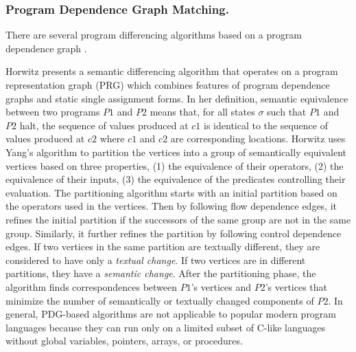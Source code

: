 \subsubsection{Program Dependence Graph Matching.}
There are several program differencing algorithms based on a program dependence graph \cite{Horwitz1990, Binkley1995, Jackson1994}. 

Horwitz \cite{Horwitz1990} presents a semantic differencing algorithm that operates on a program representation graph (PRG) which combines features of program dependence graphs and static single assignment forms. In her definition, semantic equivalence between two programs $P1$ and $P2$ means that, for all states $\sigma$ such that $P1$ and $P2$ halt, the sequence of values produced at $c1$ is identical to the sequence of values produced at $c2$ where $c1$ and $c2$ are corresponding locations. 
Horwitz uses Yang's algorithm \cite{Yang1989} to partition the vertices into a group of semantically equivalent vertices based on three properties, (1) the equivalence of their operators, (2) the equivalence of their inputs, (3) the equivalence of the predicates controlling their evaluation. The partitioning algorithm starts with an initial partition based on the operators used in the vertices. Then by following flow dependence edges, it refines the initial partition if the successors of the same group are not in the same group. Similarly, it further refines the partition by following control dependence edges. If two vertices in the same partition are textually different, they are considered to have only a {\it textual change}. If two vertices are in different partitions, they have a {\it semantic change}. After the partitioning phase, the algorithm finds correspondences between $P1$'s vertices and $P2$'s vertices that minimize the number of semantically or textually changed components of $P2$. 
In general, PDG-based algorithms are not applicable to popular modern program languages because they can run only on a limited subset of C-like languages without global variables, pointers, arrays, or procedures. 


